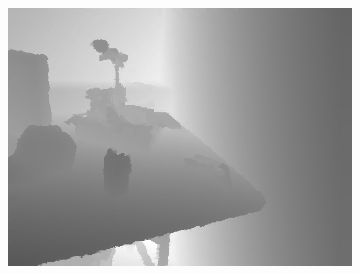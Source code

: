 \documentclass[preprint,10pt,5p,times,twocolumn]{elsarticle}
\begin{document}
\begin{figure}[t]
\begin{center}
\begin{subfigure}[b]{0.136\linewidth}
    \includegraphics[width=\linewidth]{table_upsampling_inpainting.png}
\end{subfigure}


\end{center}
\end{figure}
\end{document}
